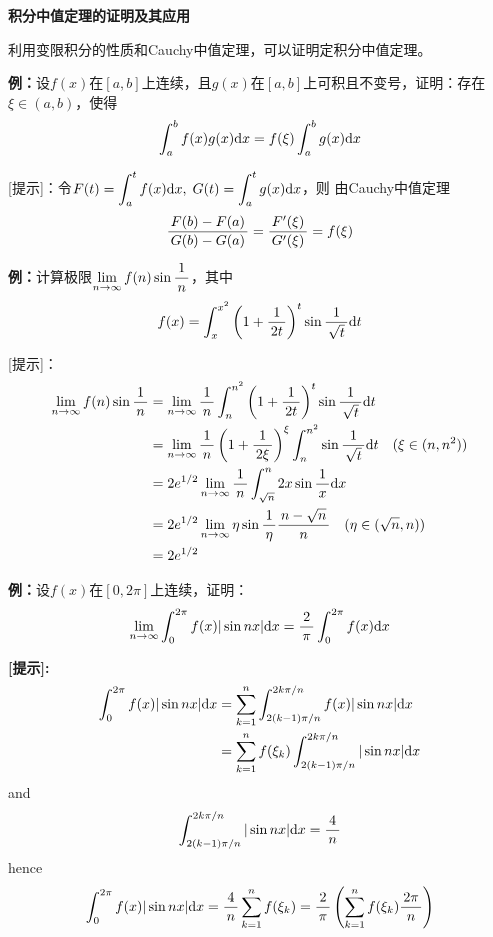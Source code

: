 \begin{shaded}
	{\bf 积分中值定理的证明及其应用}
	
	利用变限积分的性质和Cauchy中值定理，可以证明定积分中值定理。

	{\bf 例：}设$f(x)$在$[a,b]$上连续，且$g(x)$在$[a,b]$上可积且不变号，证明：存在
	$\xi\in(a,b)$，使得
	$$\dint_a^bf(x)g(x)\d x=f(\xi)\dint_a^bg(x)\d x$$
	
	[提示]：令$F(t)=\dint_a^tf(x)\d x,\;G(t)=\dint_a^tg(x)\d x$，则
	由Cauchy中值定理
	$$\df{F(b)-F(a)}{G(b)-G(a)}=\df{F'(\xi)}{G'(\xi)}=f(\xi)$$
	
	{\bf 例：}计算极限$\limn f(n)\sin\df 1n$，其中
	  $$f(x)=\dint_x^{x^2}\left(1+\df 1{2t}\right)^t\sin\df{1}{\sqrt t}\d t$$
	
	[提示]：
	\begin{align}
		\limn f(n)\sin\df 1n&=\limn\df1n\dint_n^{n^2}\left(1+\df
		1{2t}\right)^t\sin\df{1}{\sqrt t}\d t\notag\\
		&=\limn\df1n\left(1+\df1{2\xi}\right)^{\xi}\dint_n^{n^2}
		\sin\df1{\sqrt t}\d t\quad(\xi\in(n,n^2))\notag\\
		&=2e^{1/2}\limn\df1n\dint_{\sqrt n}^n2x\sin\df1x\d x\notag\\
		&=2e^{1/2}\limn\eta\sin\df1{\eta}\df{n-\sqrt n}n\quad(\eta\in(\sqrt
		n,n))\notag\\
		&=2e^{1/2}\notag
	\end{align}
	
	{\bf 例：}设$f(x)$在$[0,2\pi]$上连续，证明：
	$$\limn\dint_0^{2\pi}f(x)|\sin nx|\d x=\df 2{\pi}\dint_0^{2\pi}f(x)\d x$$
	
	{\bf [提示]:}
	\begin{align}
	\dint_0^{2\pi}f(x)|\sin nx|\d x
	&=\sum\limits_{k=1}^n\dint_{2(k-1)\pi/n}^{2k\pi/n}f(x)|\sin nx|\d x\notag\\
	&=\sum\limits_{k=1}^nf(\xi_k)\dint_{2(k-1)\pi/n}^{2k\pi/n}|\sin nx|\d x\notag
	\end{align}
	and
	$$\dint_{2(k-1)\pi/n}^{2k\pi/n}|\sin nx|\d x=\df4n$$
	hence
	$$\dint_0^{2\pi}f(x)|\sin nx|\d x=\df4n\sum\limits_{k=1}^nf(\xi_k)
	=\df2{\pi}\left(\sum\limits_{k=1}^nf(\xi_k)\df{2\pi}n\right)$$
\end{shaded}

